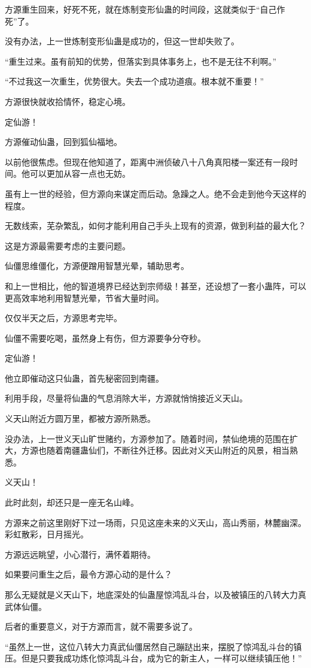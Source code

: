 \begin{this_body}
方源重生回来，好死不死，就在炼制变形仙蛊的时间段，这就类似于“自己作死”了。

没有办法，上一世炼制变形仙蛊是成功的，但这一世却失败了。

“重生过来。虽有前知的优势，但落实到具体事务上，也不是无往不利啊。”

“不过我这一次重生，优势很大。失去一个成功道痕。根本就不重要！”

方源很快就收拾情怀，稳定心境。

定仙游！

方源催动仙蛊，回到狐仙福地。

以前他很焦虑。但现在他知道了，距离中洲侦破八十八角真阳楼一案还有一段时间。他可以更加从容一点也无妨。

虽有上一世的经验，但方源向来谋定而后动。急躁之人。绝不会走到他今天这样的程度。

无数线索，芜杂繁乱，如何才能利用自己手头上现有的资源，做到利益的最大化？

这是方源最需要考虑的主要问题。

仙僵思维僵化，方源便蹭用智慧光晕，辅助思考。

和上一世相比，他的智道境界已经达到宗师级！甚至，还设想了一套小蛊阵，可以更高效率地利用智慧光晕，节省大量时间。

仅仅半天之后，方源思考完毕。

仙僵不需要吃喝，虽然身上有伤，但方源要争分夺秒。

定仙游！

他立即催动这只仙蛊，首先秘密回到南疆。

利用手段，尽量将仙蛊的气息消除大半，方源就悄悄接近义天山。

义天山附近方圆万里，都被方源所熟悉。

没办法，上一世义天山旷世赌约，方源参加了。随着时间，禁仙绝境的范围在扩大，方源也随着南疆蛊仙们，不断往外迁移。因此对义天山附近的风景，相当熟悉。

义天山！

此时此刻，却还只是一座无名山峰。

方源来之前这里刚好下过一场雨，只见这座未来的义天山，高山秀丽，林麓幽深。彩虹散彩，日月摇光。

方源远远眺望，小心潜行，满怀着期待。

如果要问重生之后，最令方源心动的是什么？

那么无疑就是义天山下，地底深处的仙蛊屋惊鸿乱斗台，以及被镇压的八转大力真武体仙僵。

后者的重要意义，对于方源而言，就不需要多说了。

“虽然上一世，这位八转大力真武仙僵居然自己蹦跶出来，摆脱了惊鸿乱斗台的镇压。但是只要我成功炼化惊鸿乱斗台，成为它的新主人，一样可以继续镇压他！”


\end{this_body}
